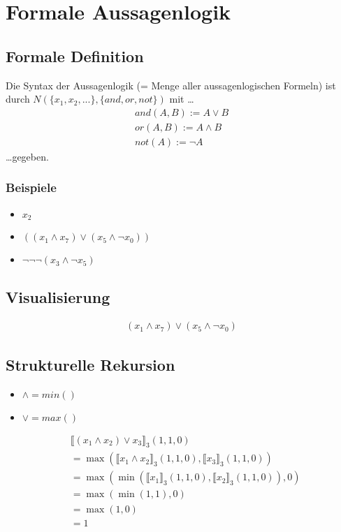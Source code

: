 \section{Formale Aussagenlogik}

\subsection{Formale Definition}
Die Syntax der Aussagenlogik (= Menge aller aussagenlogischen Formeln) ist
durch $N(\{x_1,x_2,...\},\{and,or,not\})$ mit \dots
\begin{align*}
	and(A,B) := A \vee B  \\
	or(A,B) := A \wedge B \\
	not(A) := \neg A
\end{align*}
\dots gegeben.
\subsubsection{Beispiele}
\begin{itemize}
	\item $x_2$
	\item $((x_1 \wedge x_7) \vee (x_5 \wedge \neg x_0))$
	\item $\neg\neg\neg(x_3 \wedge \neg x_5)$
\end{itemize}
\subsection{Visualisierung}

\begin{align*}
	(x_1 \wedge x_7) \vee (x_5 \wedge \neg x_0)
\end{align*}

\begin{center}
\end{center}
\subsection{Strukturelle Rekursion}
\begin{itemize}
    \item $\wedge = min()$
    \item $\vee = max()$
\end{itemize}
\begin{align*}
    &\llbracket(x_1 \wedge x_2) \vee x_3\rrbracket_3(1, 1, 0) \\
	&= \max(\llbracket x_1 \wedge x_2\rrbracket_3(1, 1, 0), \llbracket x_3\rrbracket_3(1, 1, 0)) \\
    &= \max(\min(\llbracket x_1\rrbracket_3(1, 1, 0), \llbracket x_2\rrbracket_3(1, 1, 0)), 0) \\
    &= \max(\min(1, 1), 0) \\
    &= \max(1, 0) \\
    &= 1
\end{align*}
